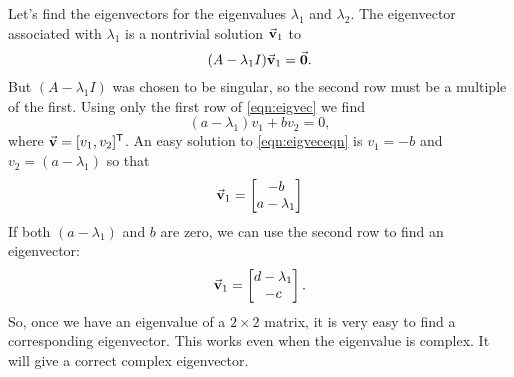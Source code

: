 Let's find the eigenvectors
for the eigenvalues $\lambda_1$ and $\lambda_2$.
The eigenvector associated with $\lambda_1$ is a nontrivial
solution $\vec{\textbf{v}}_1$ to
\begin{equation}
    (A-\lambda_1 I)\vec{\textbf{v}}_1 = \vec{\textbf{0}}.
\label{eqn:eigvec}
\end{equation}
But $(A-\lambda_1 I)$ was chosen to be singular, so the second row must
be a multiple of the first.  Using only the first row of 
\eqref{eqn:eigvec} we find 
\begin{equation}
  (a-\lambda_1)v_1 + b v_2 = 0,
\label{eqn:eigveceqn}
\end{equation}
where $\vec{\textbf{v}} = [v_1,v_2]^{\textsf{T}}$.
An easy solution to \eqref{eqn:eigveceqn}
is $v_1=-b$ and $v_2 = (a-\lambda_1)$ so that
\[
   \vec{\textbf{v}}_1 = \begin{bmatrix} -b \\ a-\lambda_1 \end{bmatrix}
\]
If both $(a-\lambda_1)$ and $b$ are zero, we can use the
second row to find an eigenvector:
\[
   \vec{\textbf{v}}_1 = \begin{bmatrix} d-\lambda_1 \\ -c \end{bmatrix}.
\]
So, once we have an eigenvalue
of a $2\times 2$ matrix, it is very easy to find
a corresponding eigenvector.
This works even when the eigenvalue is complex.
It will give a correct complex eigenvector.

